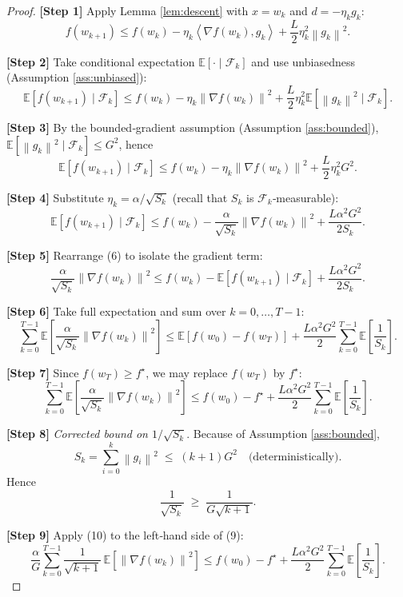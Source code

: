 \documentclass[11pt]{article}
\newcommand{\EE}{\mathbb{E}}
\newcommand{\norm}[1]{\left\|#1\right\|}
\newcommand{\inner}[2]{\left\langle #1,#2 \right\rangle}
\begin{document}
\begin{proof}
\textbf{[Step 1]} Apply Lemma \ref{lem:descent} with $x=w_k$ and $d=-\eta_k g_k$:
\[
f(w_{k+1})\le f(w_k)-\eta_k\inner{\nabla f(w_k)}{g_k}+\frac{L}{2}\eta_k^{2}\norm{g_k}^{2}.
\tag{3}
\]

\textbf{[Step 2]} Take conditional expectation $\EE[\cdot\mid\mathcal{F}_k]$ and use unbiasedness (Assumption \ref{ass:unbiased}):
\[
\EE\!\left[f(w_{k+1})\mid\mathcal{F}_k\right]
\le f(w_k)-\eta_k\norm{\nabla f(w_k)}^{2}
+\frac{L}{2}\eta_k^{2}\EE\!\left[\norm{g_k}^{2}\mid\mathcal{F}_k\right].
\tag{4}
\]

\textbf{[Step 3]} By the bounded‑gradient assumption (Assumption \ref{ass:bounded}),
$\EE\!\left[\norm{g_k}^{2}\mid\mathcal{F}_k\right]\le G^{2}$, hence
\[
\EE\!\left[f(w_{k+1})\mid\mathcal{F}_k\right]
\le f(w_k)-\eta_k\norm{\nabla f(w_k)}^{2}
+\frac{L}{2}\eta_k^{2}G^{2}.
\tag{5}
\]

\textbf{[Step 4]} Substitute $\eta_k=\alpha/\sqrt{S_k}$ (recall that $S_k$ is $\mathcal{F}_k$‑measurable):
\[
\EE\!\left[f(w_{k+1})\mid\mathcal{F}_k\right]
\le f(w_k)-\frac{\alpha}{\sqrt{S_k}}\norm{\nabla f(w_k)}^{2}
+\frac{L\alpha^{2}G^{2}}{2S_k}.
\tag{6}
\]

\textbf{[Step 5]} Rearrange (6) to isolate the gradient term:
\[
\frac{\alpha}{\sqrt{S_k}}\norm{\nabla f(w_k)}^{2}
\le f(w_k)-\EE\!\left[f(w_{k+1})\mid\mathcal{F}_k\right]
+\frac{L\alpha^{2}G^{2}}{2S_k}.
\tag{7}
\]

\textbf{[Step 6]} Take full expectation and sum over $k=0,\dots,T-1$:
\[
\sum_{k=0}^{T-1}\EE\!\left[\frac{\alpha}{\sqrt{S_k}}\norm{\nabla f(w_k)}^{2}\right]
\le \EE\!\left[f(w_0)-f(w_T)\right]
+\frac{L\alpha^{2}G^{2}}{2}\sum_{k=0}^{T-1}\EE\!\left[\frac{1}{S_k}\right].
\tag{8}
\]

\textbf{[Step 7]} Since $f(w_T)\ge f^\star$, we may replace $f(w_T)$ by $f^\star$:
\[
\sum_{k=0}^{T-1}\EE\!\left[\frac{\alpha}{\sqrt{S_k}}\norm{\nabla f(w_k)}^{2}\right]
\le f(w_0)-f^\star
+\frac{L\alpha^{2}G^{2}}{2}\sum_{k=0}^{T-1}\EE\!\left[\frac{1}{S_k}\right].
\tag{9}
\]

\textbf{[Step 8]} \emph{Corrected bound on $1/\sqrt{S_k}$}.  
Because of Assumption \ref{ass:bounded},
\[
S_k=\sum_{i=0}^{k}\norm{g_i}^{2}\;\le\;(k+1)G^{2}\quad\text{(deterministically)}.
\]
Hence
\[
\frac{1}{\sqrt{S_k}}\;\ge\;\frac{1}{G\sqrt{k+1}} .
\tag{10}
\]

\textbf{[Step 9]} Apply (10) to the left‑hand side of (9):
\[
\frac{\alpha}{G}\sum_{k=0}^{T-1}\frac{1}{\sqrt{k+1}}\,
\EE\!\left[\norm{\nabla f(w_k)}^{2}\right]
\le f(w_0)-f^\star
+\frac{L\alpha^{2}G^{2}}{2}\sum_{k=0}^{T-1}\EE\!\left[\frac{1}{S_k}\right].
\tag{11}
\]


\end{proof}
\end{document}
